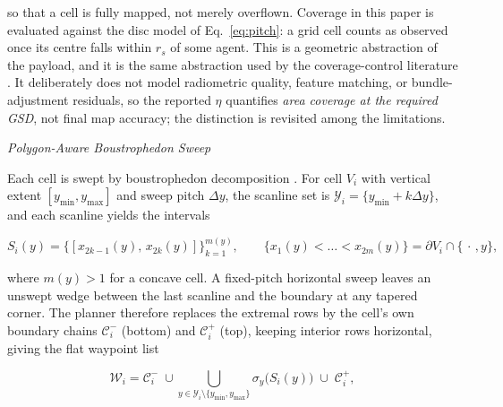 \documentclass[10pt,letterpaper]{article}
\newcommand{\headingthree}[1]{%
    \par\vspace{6pt}%
    {\centering\fontsize{10}{12}\selectfont\itshape #1\par}%
    \vspace{2pt}\noindent\ignorespaces}
\newcommand{\cit}[1]{\cite{#1}}
\newcommand{\citt}[2]{\cite{#1,#2}}
\begin{document}
so that a cell is fully mapped, not merely overflown. Coverage in this paper is evaluated
against the disc model of Eq.~\eqref{eq:pitch}: a grid cell counts as observed once its
centre falls within $r_s$ of some agent. This is a geometric abstraction of the payload,
and it is the same abstraction used by the coverage-control literature
\cit{cortesCoverageControl2004}. It deliberately does not model radiometric quality,
feature matching, or bundle-adjustment residuals, so the reported $\eta$ quantifies
\emph{area coverage at the required GSD}, not final map accuracy; the distinction is
revisited among the limitations.

\headingthree{Polygon-Aware Boustrophedon Sweep}

Each cell is swept by boustrophedon decomposition
\citt{chosetBoustrophedonDecomposition1998}{chosetCoverageSurvey2001}. For cell $V_i$
with vertical extent $[y_{\min},y_{\max}]$ and sweep pitch $\Delta y$, the scanline set
is $\mathcal{Y}_i=\{y_{\min}+k\Delta y\}$, and each scanline yields the
intervals

\begin{equation}
    \label{eq:e4}
    S_i(y)=\bigl\{[x_{2k-1}(y),\,x_{2k}(y)]\bigr\}_{k=1}^{m(y)},
    \qquad
    \{x_1(y)<\dots<x_{2m}(y)\}=\partial V_i\cap\{\,\cdot\,,y\},
\end{equation}

where $m(y)>1$ for a concave cell. A fixed-pitch horizontal sweep leaves an unswept wedge
between the last scanline and the boundary at any tapered corner. The planner therefore
replaces the extremal rows by the cell's own boundary chains $\mathcal{C}^-_i$ (bottom) and
$\mathcal{C}^+_i$ (top), keeping interior rows horizontal, giving the flat waypoint list

\begin{equation}
    \label{eq:e5}
    \mathcal{W}_i=\mathcal{C}^-_i \;\cup\!\!
    \bigcup_{y\in\mathcal{Y}_i\setminus\{y_{\min},y_{\max}\}}\!\!\sigma_y\bigl(S_i(y)\bigr)
    \;\cup\; \mathcal{C}^+_i,
\end{equation}
\end{document}

